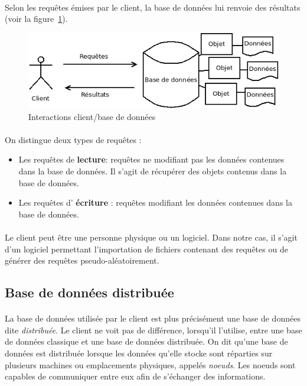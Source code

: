 \documentclass[12pt]{article}
\begin{document}
\paragraph{}Selon les requêtes émises par le client, la base de données lui renvoie des résultats (voir la figure~\ref{fig:bd}).


\begin{figure}[h]
	\centering
		\includegraphics[width=12cm]{images/besoins/bd.png}
	\caption{Interactions client/base de données \label{fig:bd}}
\end{figure}


\paragraph{} On distingue deux types de requêtes :
\begin{itemize}
 \item Les requêtes de \textbf{lecture}: requêtes ne modifiant pas les données contenues dans la base de données.
 Il s'agit de récupérer des objets contenus dans la base de données.
 
 \item Les requêtes d' \textbf{écriture} : requêtes modifiant les données contenues dans la base de données.
\end{itemize}

\paragraph{} Le client peut être une personne physique ou un logiciel. Dans notre cas, il s'agit d'un logiciel permettant l'importation de fichiers contenant des requêtes ou de générer des requêtes pseudo-aléatoirement.


\subsection{Base de données distribuée}

\paragraph{} La base de données utilisée par le client est plus précisément une base de données dite \textit{distribuée}. Le client ne voit pas de différence, lorsqu'il l'utilise, entre une base de données classique et une base de données distribuée. On dit qu'une base de données est distribuée lorsque les données qu'elle stocke sont réparties sur plusieurs machines ou emplacements physiques, appelés \textit{noeuds}. Les noeuds sont capables de communiquer entre eux afin de s'échanger des informations.
\end{document}
